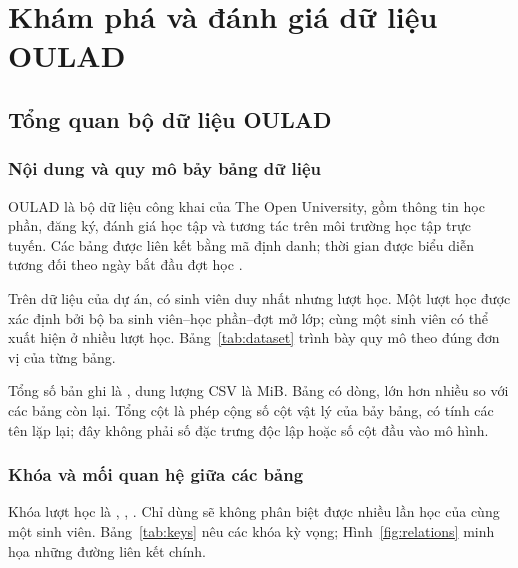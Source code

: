 \chapter{Khám phá và đánh giá dữ liệu OULAD}
\label{chap:eda}

\section{Tổng quan bộ dữ liệu OULAD}
\subsection{Nội dung và quy mô bảy bảng dữ liệu}
OULAD là bộ dữ liệu công khai của The Open University, gồm thông tin học phần, đăng ký, đánh giá học tập và tương tác trên môi trường học tập trực tuyến. Các bảng được liên kết bằng mã định danh; thời gian được biểu diễn tương đối theo ngày bắt đầu đợt học \autocite{kuzilek2017,ouladDataset}.

Trên dữ liệu của dự án, có \NStudents{} sinh viên duy nhất nhưng \NEnrollments{} lượt học. Một lượt học được xác định bởi bộ ba sinh viên--học phần--đợt mở lớp; cùng một sinh viên có thể xuất hiện ở nhiều lượt học. Bảng~\ref{tab:dataset} trình bày quy mô theo đúng đơn vị của từng bảng.

\begin{table}[tbp]
\centering
\caption{Nội dung và quy mô bảy bảng OULAD trong dự án.}
\label{tab:dataset}

\end{table}

Tổng số bản ghi là \NTotalRecords{}, dung lượng CSV là \RawSizeMiB{} MiB. Bảng  có \NVleRecords{} dòng, lớn hơn nhiều so với các bảng còn lại. Tổng \NRawColumns{} cột là phép cộng số cột vật lý của bảy bảng, có tính các tên lặp lại; đây không phải số đặc trưng độc lập hoặc số cột đầu vào mô hình.

\subsection{Khóa và mối quan hệ giữa các bảng}
Khóa lượt học là , , . Chỉ dùng  sẽ không phân biệt được nhiều lần học của cùng một sinh viên. Bảng~\ref{tab:keys} nêu các khóa kỳ vọng; Hình~\ref{fig:relations} minh họa những đường liên kết chính.

